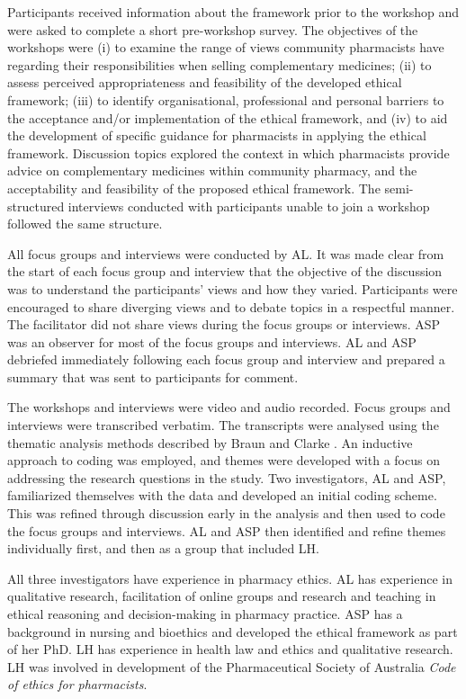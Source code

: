 \documentclass[12pt,]{article}
\begin{document}
Participants received information about the framework prior to the
workshop and were asked to complete a short pre-workshop survey. The
objectives of the workshops were (i) to examine the range of views
community pharmacists have regarding their responsibilities when selling
complementary medicines; (ii) to assess perceived appropriateness and
feasibility of the developed ethical framework; (iii) to identify
organisational, professional and personal barriers to the acceptance
and/or implementation of the ethical framework, and (iv) to aid the
development of specific guidance for pharmacists in applying the ethical
framework. Discussion topics explored the context in which pharmacists
provide advice on complementary medicines within community pharmacy, and
the acceptability and feasibility of the proposed ethical framework. The
semi-structured interviews conducted with participants unable to join a
workshop followed the same structure.

All focus groups and interviews were conducted by AL. It was made clear
from the start of each focus group and interview that the objective of
the discussion was to understand the participants' views and how they
varied. Participants were encouraged to share diverging views and to
debate topics in a respectful manner. The facilitator did not share
views during the focus groups or interviews. ASP was an observer for
most of the focus groups and interviews. AL and ASP debriefed
immediately following each focus group and interview and prepared a
summary that was sent to participants for comment.

The workshops and interviews were video and audio recorded. Focus groups
and interviews were transcribed verbatim. The transcripts were analysed
using the thematic analysis methods described by Braun and Clarke
\autocite*{Braun2016}. An inductive approach to coding was employed, and
themes were developed with a focus on addressing the research questions
in the study. Two investigators, AL and ASP, familiarized themselves
with the data and developed an initial coding scheme. This was refined
through discussion early in the analysis and then used to code the focus
groups and interviews. AL and ASP then identified and refine themes
individually first, and then as a group that included LH.

All three investigators have experience in pharmacy ethics. AL has
experience in qualitative research, facilitation of online groups and
research and teaching in ethical reasoning and decision-making in
pharmacy practice. ASP has a background in nursing and bioethics and
developed the ethical framework as part of her PhD. LH has experience in
health law and ethics and qualitative research. LH was involved in
development of the Pharmaceutical Society of Australia \emph{Code of
ethics for pharmacists}.
\end{document}
